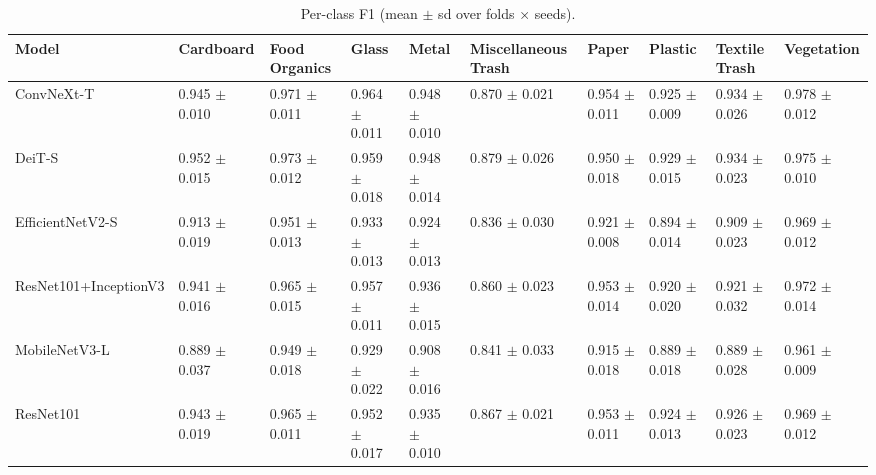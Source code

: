 \begin{table}[ht]
\centering
\small
\caption{Per-class F1 (mean $\pm$ sd over folds × seeds).}
\label{tab:tab7_perclass_f1}
\begin{tabular}{llllllllll}
\hline
Model & Cardboard & Food Organics & Glass & Metal & Miscellaneous Trash & Paper & Plastic & Textile Trash & Vegetation \\
\hline
ConvNeXt-T & 0.945 $\pm$ 0.010 & 0.971 $\pm$ 0.011 & 0.964 $\pm$ 0.011 & 0.948 $\pm$ 0.010 & 0.870 $\pm$ 0.021 & 0.954 $\pm$ 0.011 & 0.925 $\pm$ 0.009 & 0.934 $\pm$ 0.026 & 0.978 $\pm$ 0.012 \\
DeiT-S & 0.952 $\pm$ 0.015 & 0.973 $\pm$ 0.012 & 0.959 $\pm$ 0.018 & 0.948 $\pm$ 0.014 & 0.879 $\pm$ 0.026 & 0.950 $\pm$ 0.018 & 0.929 $\pm$ 0.015 & 0.934 $\pm$ 0.023 & 0.975 $\pm$ 0.010 \\
EfficientNetV2-S & 0.913 $\pm$ 0.019 & 0.951 $\pm$ 0.013 & 0.933 $\pm$ 0.013 & 0.924 $\pm$ 0.013 & 0.836 $\pm$ 0.030 & 0.921 $\pm$ 0.008 & 0.894 $\pm$ 0.014 & 0.909 $\pm$ 0.023 & 0.969 $\pm$ 0.012 \\
ResNet101+InceptionV3 & 0.941 $\pm$ 0.016 & 0.965 $\pm$ 0.015 & 0.957 $\pm$ 0.011 & 0.936 $\pm$ 0.015 & 0.860 $\pm$ 0.023 & 0.953 $\pm$ 0.014 & 0.920 $\pm$ 0.020 & 0.921 $\pm$ 0.032 & 0.972 $\pm$ 0.014 \\
MobileNetV3-L & 0.889 $\pm$ 0.037 & 0.949 $\pm$ 0.018 & 0.929 $\pm$ 0.022 & 0.908 $\pm$ 0.016 & 0.841 $\pm$ 0.033 & 0.915 $\pm$ 0.018 & 0.889 $\pm$ 0.018 & 0.889 $\pm$ 0.028 & 0.961 $\pm$ 0.009 \\
ResNet101 & 0.943 $\pm$ 0.019 & 0.965 $\pm$ 0.011 & 0.952 $\pm$ 0.017 & 0.935 $\pm$ 0.010 & 0.867 $\pm$ 0.021 & 0.953 $\pm$ 0.011 & 0.924 $\pm$ 0.013 & 0.926 $\pm$ 0.023 & 0.969 $\pm$ 0.012 \\
\hline
\end{tabular}
\end{table}